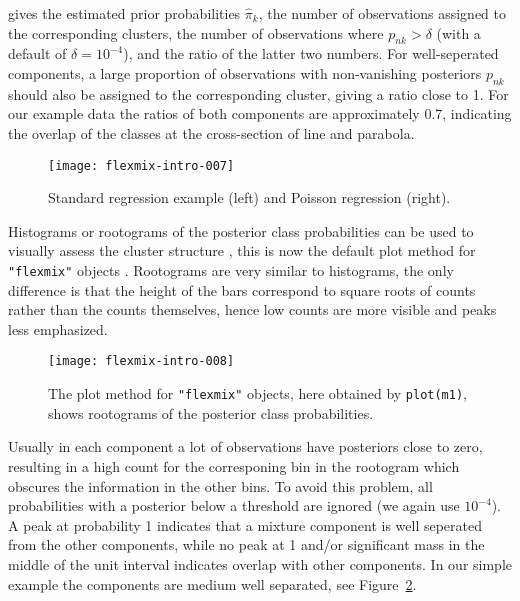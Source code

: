 \documentclass{jss}
\begin{document}
gives the estimated prior probabilities $\hat\pi_k$, the
number of observations assigned to the corresponding clusters, the
number of observations where $p_{nk}>\delta$ (with a default of
$\delta=10^{-4}$), and the ratio of the latter two numbers. For
well-seperated components, a large proportion of observations with
non-vanishing posteriors $p_{nk}$ should also be assigned to the
corresponding cluster, giving a ratio close to 1. For our example data the
ratios of both components are approximately 0.7, indicating the
overlap of the classes at the cross-section of line and parabola.



\begin{figure}[htbp]
  \centering
\texttt{[image: flexmix-intro-007]}
  \caption{Standard regression example (left) and Poisson regression (right).}
  \label{fig:npreg}
\end{figure}

Histograms or rootograms of the posterior class probabilities can be
used to visually assess the cluster structure
\citep{fla:Tantrum+Murua+Stuetzle:2003}, this is now the default plot
method for \texttt{"flexmix"} objects
\citep{e1071-papers:Leisch:2004}. Rootograms are very similar to
histograms, the only difference is that the height of the bars
correspond to square roots of counts rather than the counts
themselves, hence low counts are more visible and peaks less
emphasized.

\begin{figure}[htbp]
  \centering
\texttt{[image: flexmix-intro-008]}
\caption{The plot method for \texttt{"flexmix"} objects, here obtained
  by \texttt{plot(m1)}, shows rootograms of the posterior class
  probabilities.}
  \label{fig:root1}
\end{figure}

Usually in each component a lot of observations have posteriors close
to zero, resulting in a high count for the corresponing bin in the
rootogram which obscures the information in the other bins. To avoid
this problem, all probabilities with a posterior below a threshold are
ignored (we again use $10^{-4}$).  A peak at probability 1 indicates that a
mixture component is well seperated from the other components, while
no peak at 1 and/or significant mass in the middle of the unit
interval indicates overlap with other components. In our simple
example the components are medium well separated, see
Figure~\ref{fig:root1}. 
\end{document}
